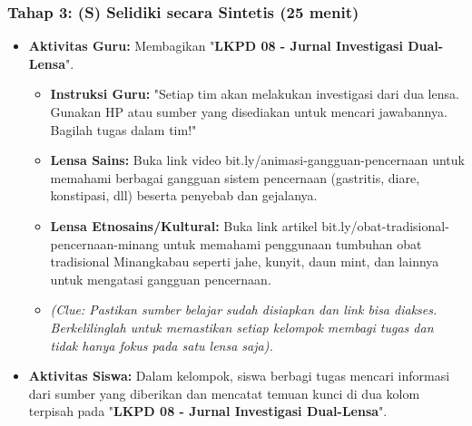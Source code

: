 \documentclass[a4paper,12pt]{article}
\begin{document}
\subsubsection{Tahap 3: (S) Selidiki secara Sintetis (25 menit)}
\begin{itemize}
\item \textbf{Aktivitas Guru:} Membagikan "\textbf{LKPD 08 - Jurnal Investigasi Dual-Lensa}".
    \begin{itemize}
    \item \textbf{Instruksi Guru:} "Setiap tim akan melakukan investigasi dari dua lensa. Gunakan HP atau sumber yang disediakan untuk mencari jawabannya. Bagilah tugas dalam tim!"
    \item \textbf{Lensa Sains:} Buka link video bit.ly/animasi-gangguan-pencernaan untuk memahami berbagai gangguan sistem pencernaan (gastritis, diare, konstipasi, dll) beserta penyebab dan gejalanya.
    \item \textbf{Lensa Etnosains/Kultural:} Buka link artikel bit.ly/obat-tradisional-pencernaan-minang untuk memahami penggunaan tumbuhan obat tradisional Minangkabau seperti jahe, kunyit, daun mint, dan lainnya untuk mengatasi gangguan pencernaan.
    \item \textit{(Clue: Pastikan sumber belajar sudah disiapkan dan link bisa diakses. Berkelilinglah untuk memastikan setiap kelompok membagi tugas dan tidak hanya fokus pada satu lensa saja).}
    \end{itemize}
\item \textbf{Aktivitas Siswa:} Dalam kelompok, siswa berbagi tugas mencari informasi dari sumber yang diberikan dan mencatat temuan kunci di dua kolom terpisah pada "\textbf{LKPD 08 - Jurnal Investigasi Dual-Lensa}".
\end{itemize}
\end{document}
